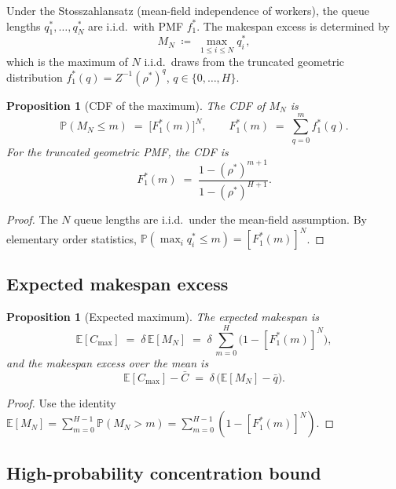 \documentclass[11pt,a4paper]{report}
\newtheorem{proposition}[theorem]{Proposition}
\newcommand{\rhostar}{\rho^{*}}
\newcommand{\qbar}{\bar{q}}
\newcommand{\Cmax}{C_{\max}}
\newcommand{\Cbar}{\bar{C}}
\begin{document}
Under the Stosszahlansatz (mean-field independence of workers), the
queue lengths $q_1^*, \ldots, q_N^*$ are i.i.d.\ with PMF $f_1^*$.
The makespan excess is determined by
\[
  M_N \;\coloneqq\; \max_{1 \leq i \leq N} q_i^*,
\]
which is the maximum of $N$ i.i.d.\ draws from the truncated geometric
distribution $f_1^*(q) = Z^{-1}(\rhostar)^q$, $q \in \{0,\ldots,H\}$.

\begin{proposition}[CDF of the maximum]
\label{prop:max-cdf}
The CDF of $M_N$ is
\begin{equation}
  \mathbb{P}(M_N \leq m)
  \;=\; \bigl[F_1^*(m)\bigr]^N,
  \qquad F_1^*(m) \;=\; \sum_{q=0}^{m} f_1^*(q).
  \label{eq:max-cdf}
\end{equation}
For the truncated geometric PMF, the CDF is
\[
  F_1^*(m) \;=\; \frac{1-(\rhostar)^{m+1}}{1-(\rhostar)^{H+1}}.
\]
\end{proposition}

\begin{proof}
The $N$ queue lengths are i.i.d.\ under the mean-field assumption.
By elementary order statistics, $\mathbb{P}(\max_i q_i^* \leq m) = [F_1^*(m)]^N$.
\end{proof}

\subsection{Expected makespan excess}

\begin{proposition}[Expected maximum]
\label{prop:exp-max}
The expected makespan is
\begin{equation}
  \mathbb{E}[\Cmax]
  \;=\; \delta\,\mathbb{E}[M_N]
  \;=\; \delta\,\sum_{m=0}^{H} \bigl(1 - [F_1^*(m)]^N\bigr),
  \label{eq:exp-cmax}
\end{equation}
and the makespan excess over the mean is
\begin{equation}
  \mathbb{E}[\Cmax] - \Cbar
  \;=\; \delta\,\bigl(\mathbb{E}[M_N] - \qbar\bigr).
  \label{eq:excess}
\end{equation}
\end{proposition}

\begin{proof}
Use the identity $\mathbb{E}[M_N] = \sum_{m=0}^{H-1} \mathbb{P}(M_N > m)
= \sum_{m=0}^{H-1}(1-[F_1^*(m)]^N)$.
\end{proof}

\subsection{High-probability concentration bound}
\end{document}
